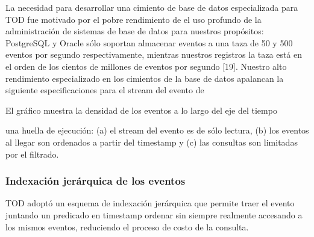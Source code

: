 \documentclass[12pt,a4paper]{report}
\begin{document}
La necesidad para desarrollar una cimiento de base de datos especializada para TOD fue motivado por el pobre rendimiento de el uso profundo de la administración de sistemas de base de datos para nuestros propósitos: PostgreSQL y Oracle sólo soportan almacenar eventos a una taza de 50 y 500 eventos por segundo respectivamente, mientras nuestros registros la taza está en el orden de los cientos de millones de eventos por segundo [19].  Nuestro alto rendimiento especializado en los cimientos de la base de datos apalancan la siguiente especificaciones para el stream del evento de 

El gráfico muestra la densidad de los eventos a lo largo del eje del tiempo

una huella de ejecución: (a) el stream del evento es de sólo lectura, (b) los eventos al llegar son ordenados a partir del timestamp y (c) las consultas son limitadas por el filtrado.

			\subsubsection{Indexación jerárquica de los eventos}

TOD adoptó un esquema de indexación jerárquica que permite traer el evento juntando un predicado en timestamp ordenar sin siempre realmente accesando a los mismos eventos, reduciendo el proceso de costo de la consulta.
\end{document}
